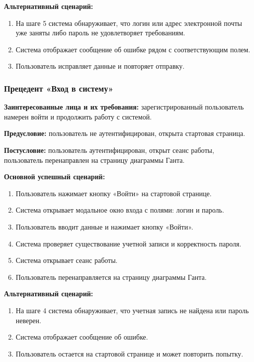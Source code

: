 \textbf{Альтернативный сценарий:}
\begin{enumerate}
    \item На шаге 5 система обнаруживает, что логин или адрес электронной почты уже заняты либо пароль не удовлетворяет требованиям.
    \item Система отображает сообщение об ошибке рядом с соответствующим полем.
    \item Пользователь исправляет данные и повторяет отправку.
\end{enumerate}

\subsubsection{Прецедент «Вход в систему»}

\textbf{Заинтересованные лица и их требования:} зарегистрированный пользователь намерен войти и продолжить работу с системой.

\textbf{Предусловие:} пользователь не аутентифицирован, открыта стартовая страница.

\textbf{Постусловие:} пользователь аутентифицирован, открыт сеанс работы, пользователь перенаправлен на страницу диаграммы Ганта.

\textbf{Основной успешный сценарий:}
\begin{enumerate}
    \item Пользователь нажимает кнопку «Войти» на стартовой странице.
    \item Система открывает модальное окно входа с полями: логин и пароль.
    \item Пользователь вводит данные и нажимает кнопку «Войти».
    \item Система проверяет существование учетной записи и корректность пароля.
    \item Система открывает сеанс работы.
    \item Пользователь перенаправляется на страницу диаграммы Ганта.
\end{enumerate}

\textbf{Альтернативный сценарий:}
\begin{enumerate}
    \item На шаге 4 система обнаруживает, что учетная запись не найдена или пароль неверен.
    \item Система отображает сообщение об ошибке.
    \item Пользователь остается на стартовой странице и может повторить попытку.
\end{enumerate}


